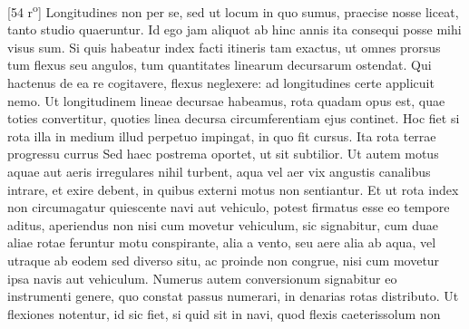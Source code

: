                 \vspace*{8mm}
                \pstart 
                \normalsize
            [54 r\textsuperscript{o}] Longitudines\protect{} non per se, sed ut locum in quo sumus, praecise nosse liceat, tanto studio quaeruntur. Id ego jam aliquot ab hinc annis ita consequi posse mihi visus sum. Si quis habeatur index facti itineris tam exactus, ut omnes prorsus tum flexus seu angulos, tum quantitates linearum decursarum ostendat. Qui hactenus de ea re cogitavere, flexus neglexere: ad longitudines\protect{} certe applicuit nemo. Ut longitudinem\protect{} lineae decursae habeamus, rota\protect{} quadam opus est, quae toties convertitur, quoties linea decursa circumferentiam ejus continet. Hoc fiet si rota\protect{} illa in medium illud perpetuo impingat, in quo fit cursus. Ita rota\protect{}  terrae  progressu currus Sed haec postrema oportet, ut sit subtilior. Ut autem motus aquae aut aeris irregulares nihil turbent, aqua vel aer vix angustis canalibus intrare, et exire debent, in quibus externi motus non sentiantur. Et ut rota\protect{} index non circumagatur quiescente navi\protect{} aut vehiculo, potest firmatus esse eo tempore aditus, aperiendus non nisi cum movetur vehiculum,  sic signabitur, cum duae aliae rotae\protect{} feruntur motu conspirante, alia a vento, seu aere alia ab aqua, vel utraque ab eodem sed diverso situ, ac proinde non congrue, nisi cum movetur ipsa navis\protect{} aut vehiculum. Numerus autem conversionum signabitur eo instrumenti genere, quo constat passus numerari, in denarias rotas\protect{} distributo. Ut flexiones notentur, id sic fiet, si quid sit in navi\protect{}, quod flexis caeteris\hfill solum non\pend
